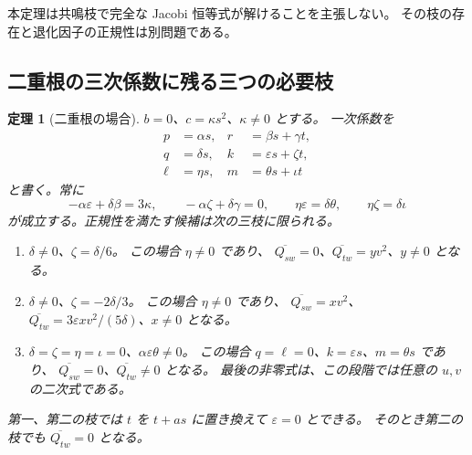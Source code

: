 \documentclass[11pt,a4paper]{ltjsarticle}
\newtheorem{theorem}{定理}[section]
\theoremstyle{remark}\newtheorem{remark}[theorem]{注意}
\begin{document}
本定理は共鳴枝で完全な Jacobi 恒等式が解けることを主張しない。
その枝の存在と退化因子の正規性は別問題である。

\subsection{二重根の三次係数に残る三つの必要枝}

\begin{theorem}[二重根の場合]\label{thm:v18-double-resonance}
$b=0$、$c=\kappa s^2$、$\kappa\ne0$ とする。
一次係数を
\begin{align*}
 p&=\alpha s,&r&=\beta s+\gamma t,\\
 q&=\delta s,&k&=\varepsilon s+\zeta t,\\
 \ell&=\eta s,&m&=\theta s+\iota t
\end{align*}
と書く。常に
\begin{equation}\label{eq:v18-double-relations}
 -\alpha\varepsilon+\delta\beta=3\kappa,\qquad
 -\alpha\zeta+\delta\gamma=0,\qquad
 \eta\varepsilon=\delta\theta,\qquad
 \eta\zeta=\delta\iota
\end{equation}
が成立する。正規性を満たす候補は次の三枝に限られる。
\begin{enumerate}
\item $\delta\ne0$、$\zeta=\delta/6$。
      この場合 $\eta\ne0$ であり、
      $\overline{Q_{sw}}=0$、$\overline{Q_{tw}}=yv^2$、$y\ne0$ となる。
\item $\delta\ne0$、$\zeta=-2\delta/3$。
      この場合 $\eta\ne0$ であり、
      $\overline{Q_{sw}}=xv^2$、
      $\overline{Q_{tw}}=3\varepsilon x v^2/(5\delta)$、$x\ne0$ となる。
\item $\delta=\zeta=\eta=\iota=0$、$\alpha\varepsilon\theta\ne0$。
      この場合 $q=\ell=0$、$k=\varepsilon s$、$m=\theta s$ であり、
      $\overline{Q_{sw}}=0$、$\overline{Q_{tw}}\ne0$ となる。
      最後の非零式は、この段階では任意の $u,v$ の二次式である。
\end{enumerate}
第一、第二の枝では $t$ を $t+as$ に置き換えて $\varepsilon=0$ とできる。
そのとき第二の枝でも $\overline{Q_{tw}}=0$ となる。
\end{theorem}
\end{document}
